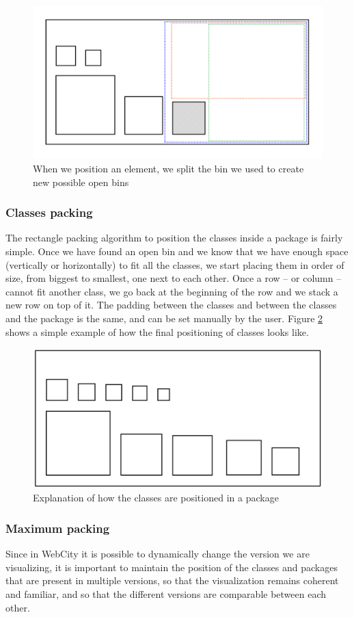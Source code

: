 \documentclass[]{usiinfbachelorproject}
\begin{document}
\begin{figure} [H]
\centering
\includegraphics[width=.7\textwidth]{pictures/binsPlacing.png}
\caption{When we position an element, we split the bin we used to create new possible open bins}
\label{fig:binsPlacing}
\end{figure}

\subsubsection{Classes packing} \label{Classes packing}
The rectangle packing algorithm to position the classes inside a package is fairly simple. Once we have found an open bin and we know that we have enough space (vertically or horizontally) to fit all the classes, we start placing them in order of size, from biggest to smallest, one next to each other. Once a row -- or column -- cannot fit another class, we go back at the beginning of the row and we stack a new row on top of it. The padding between the classes and between the classes and the package is the same, and can be set manually by the user.
Figure \ref{fig:classesPacking} shows a simple example of how the final positioning of classes looks like.

\begin{figure} [H]
\centering
\includegraphics[width=.7\textwidth]{pictures/classPacking.png}
\caption{Explanation of how the classes are positioned in a package}
\label{fig:classesPacking}
\end{figure}


\subsubsection{Maximum packing} \label{Maximum packing}
Since in WebCity it is possible to dynamically change the version we are visualizing, it is important to maintain the position of the classes and packages that are present in multiple versions, so that the visualization remains coherent and familiar, and so that the different versions are comparable between each other.
\end{document}
